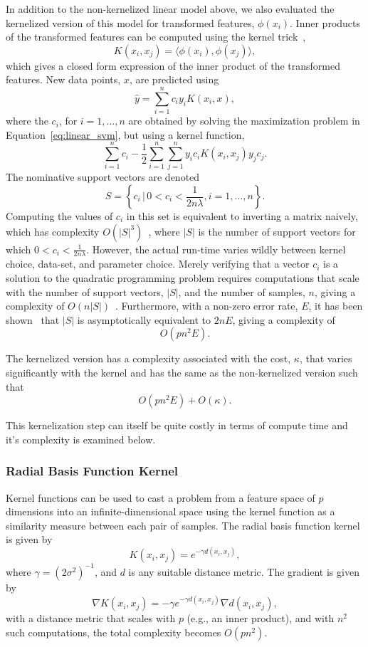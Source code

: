\documentclass[fonts]{icst}
\begin{document}
In addition to the non-kernelized linear model above, we also evaluated the kernelized version of this model for transformed features, $\phi(x_i)$. Inner products of the transformed features can be computed using the kernel trick~\cite{cortes1995support},
$$
    K(x_i, x_j) = \langle\phi(x_i), \phi(x_j)\rangle,
$$
which gives a closed form expression of the inner product of the transformed features. New data points, $x$, are predicted using
$$
    \hat{y} = \sum_{i = 1}^n c_i y_i K(x_i, x),
$$
where the $c_i$, for $i=1,\ldots,n$ are obtained by solving the maximization problem in Equation~\ref{eq:linear_svm}, but using a kernel function,
$$
    \sum_{i = 1}^n c_i - \frac{1}{2} \sum_{i=1}^n \sum_{j = 1}^n y_i c_i K(x_i, x_j) y_j c_j.
$$
The nominative support vectors are denoted
$$
    S = \left\{c_i \,\big|\, 0 < c_i < \frac{1}{2n\lambda}, i=1,\ldots,n\right\}.
$$
Computing the values of $c_i$ in this set is equivalent to inverting a matrix naively, which has complexity $O(|S|^3)$~\cite{bordes2005fast}, where $|S|$ is the number of support vectors for which $0 < c_i < \frac{1}{2n\lambda}$. However, the actual run-time varies wildly between kernel choice, data-set, and parameter choice. Merely verifying that a vector $c_i$ is a solution to the quadratic programming problem requires computations that scale with the number of support vectors, $|S|$, and the number of samples, $n$, giving a complexity of $O(n|S|)$~\cite{mehmood2015svm}. Furthermore, with a non-zero error rate, $E$, it has been shown~\cite{christmann2004robustness} that $|S|$ is asymptotically equivalent to $2nE$, giving a  complexity of
$$
    O(pn^2E).
$$

The kernelized version has a complexity associated with the cost, $\kappa$, that varies significantly with the kernel and has the same  as the non-kernelized version such that
$$
    O(pn^2 E) + O(\kappa).
$$

This kernelization step can itself be quite costly in terms of compute time and it's complexity is examined below.

\subsubsection{Radial Basis Function Kernel}

Kernel functions can be used to cast a problem from a feature space of $p$ dimensions into an infinite-dimensional space using the kernel function as a similarity measure between each pair of samples. The radial basis function kernel is given by
$$
    K(x_i, x_j) = e^{-\gamma d(x_i, x_j)},
$$
where $\gamma = (2 \sigma^2)^{-1}$, and $d$ is any suitable distance metric. The gradient is given by 
$$
    \nabla K(x_i, x_j) = - \gamma e^{-\gamma d( x_i, x_j )} \nabla d(x_i, x_j),
$$
with a distance metric that scales with $p$ (e.g., an inner product), and with $n^2$ such computations, the total complexity becomes $O(pn^2)$.
\end{document}
